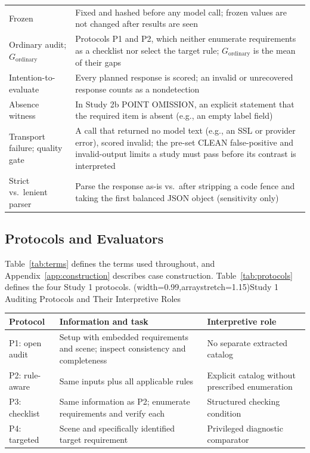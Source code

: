 \documentclass{ieeeaccess}
\begin{document}
{\begin{tabularx}{\textwidth}{@{}>{\raggedright\arraybackslash}p{}L@{}}
Frozen & Fixed and hashed before any model call; frozen values are not changed after results are seen\\
Ordinary audit; $G_{\mathrm{ordinary}}$ & Protocols P1 and P2, which neither enumerate requirements as a checklist nor select the target rule; $G_{\mathrm{ordinary}}$ is the mean of their gaps\\
Intention-to-evaluate & Every planned response is scored; an invalid or unrecovered response counts as a nondetection\\
Absence witness & In Study 2b POINT OMISSION, an explicit statement that the required item is absent (e.g., an empty label field)\\
Transport failure; quality gate & A call that returned no model text (e.g., an SSL or provider error), scored invalid; the pre-set CLEAN false-positive and invalid-output limits a study must pass before its contrast is interpreted\\
Strict vs.\ lenient parser & Parse the response as-is vs.\ after stripping a code fence and taking the first balanced JSON object (sensitivity only)\\
\bottomrule
\end{tabularx}}

\subsection{Protocols and Evaluators}
Table~\ref{tab:terms} defines the terms used throughout, and Appendix~\ref{app:construction} describes case construction. Table~\ref{tab:protocols} defines the four Study 1 protocols.
\Table[t](width=0.99\columnwidth,arraystretch=1.15){Study 1 Auditing Protocols and Their Interpretive Roles \label{tab:protocols}}{\setlength{\tabcolsep}{4pt}\begin{tabularx}{\columnwidth}{@{}>{\raggedright\arraybackslash}p{}L>{\raggedright\arraybackslash}p{0.30\columnwidth}@{}}
\toprule
Protocol & Information and task & Interpretive role\\
\midrule
P1: open audit & Setup with embedded requirements and scene; inspect consistency and completeness & No separate extracted catalog\\
P2: rule-aware & Same inputs plus all applicable rules & Explicit catalog without prescribed enumeration\\
P3: checklist & Same information as P2; enumerate requirements and verify each & Structured checking condition\\
P4: targeted & Scene and specifically identified target requirement & Privileged diagnostic comparator\\
\bottomrule
\end{tabularx}}
\end{document}

